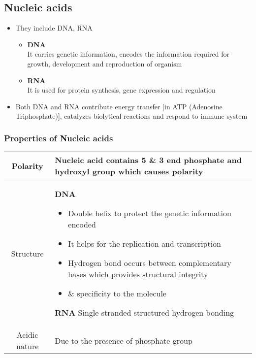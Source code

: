 \documentclass{article}
\begin{document}
	\subsection{Nucleic acids}
	\begin{itemize}
		\item They include DNA, RNA
			\begin{itemize}
				\item \textbf{DNA} \\
					It carries genetic information, encodes the information required for
					growth, development and reproduction of organism
				\item \textbf{RNA} \\
					It is used for protein synthesis, gene expression and regulation
			\end{itemize}
		\item Both DNA and RNA contribute energy transfer [in ATP (Adenosine Triphosphate)], catalyzes
			biolytical reactions and respond to immune system
	\end{itemize}

	\subsubsection{Properties of Nucleic acids}
	\begin{center}
		\begin{tabular}{|c|p{}|} \hline
			Polarity & Nucleic acid contains 5 \& 3 end phosphate and hydroxyl group which causes
				polarity \\ \hline
			\multirow{8.5}{*}{Structure} & \textbf{DNA} \vspace{.5em} \newline
				\begin{minipage}{.7\columnwidth}
					\begin{itemize}[itemsep=0pt,itemindent=-2.5em,label=]
						\item Double helix to protect the genetic information encoded
						\item It helps for the replication and transcription
						\item Hydrogen bond occurs between complementary bases which
							provides structural integrity
						\item \vspace{-.5em} \& specificity to the molecule
					\end{itemize}
				\end{minipage} \vspace{.5em} \newline
				\textbf{RNA} \newline
				Single stranded structured hydrogen bonding \\ \hline
			Acidic nature & Due to the presence of phosphate group \\ \hline
		\end{tabular}
	\end{center}
\end{document}
